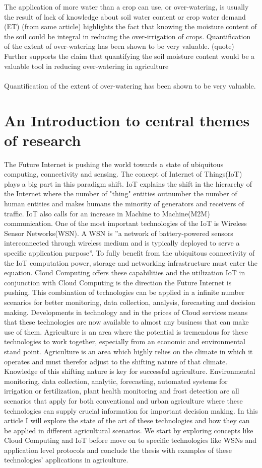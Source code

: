 \documentclass[]{uiophd}
\begin{document}
The application of more water than a crop can use, or over-watering, is usually the result of lack of knowledge about soil water content or crop water demand (ET) (from same article) highlights the fact that knowing the moisture content of the soil could be integral in reducing the over-irrigation of crops. Quantification of the extent of over-watering has been shown to be very valuable. (quote) Further supports the claim that quantifying the soil moisture content would be a valuable tool in reducing over-watering in agriculture
\\\\
Quantification of the extent of over-watering has been shown to be very valuable.

\section{An Introduction to central themes of research}
The Future Internet is pushing the world towards a state of ubiquitous computing, connectivity and sensing. The concept of Internet of Things(IoT) plays a big part in this paradigm shift. IoT explains the shift in the hierarchy of the Internet where the number of "thing" entities outnumber the number of human entities and makes humans the minority of generators and receivers of traffic. IoT also calls for an increase in Machine to Machine(M2M) communication. One of the most important technologies of the IoT is Wireless Sensor Networks(WSN). A WSN is ''a network of battery-powered sensors interconnected through wireless medium and is typically deployed to serve a specific application purpose''\cite{Ojha2015662}. To fully benefit from the ubiquitous connectivity of the IoT computation power, storage and networking infrastructure must enter the equation. Cloud Computing offers these capabilities and the utilization IoT in conjunction with Cloud Computing is the direction the Future Internet is pushing. This combination of technologies can be applied in a infinite number scenarios for better monitoring, data collection, analysis, forecasting and decision making. Developments in technology and in the prices of Cloud services means that these technologies are now available to almost any business that can make use of them. Agriculture is an area where the potential is tremendous for these technologies to work together, especially from an economic and environmental stand point. Agriculture is an area which highly relies on the climate in which it operates and must therefor adjust to the shifting nature of that climate. Knowledge of this shifting nature is key for successful agriculture. Environmental monitoring, data collection, analytic, forecasting, automated systems for irrigation or fertilization, plant health monitoring and frost detection are all scenarios that apply for both conventional and urban agriculture where these technologies can supply crucial information for important decision making. In this article I will explore the state of the art of these technologies and how they can be applied in different agricultural scenarios. We start by exploring concepts like Cloud Computing and IoT before move on to specific technologies like WSNs and application level protocols and conclude the thesis with examples of these technologies' applications in agriculture.
\end{document}

